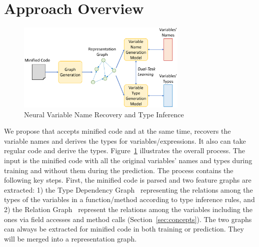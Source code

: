 \section{Approach Overview}


\begin{figure}[t]
	\begin{center}
	  \includegraphics[width=3.2in]{figures/overview-2.png}
          \vspace{-8pt}
          \caption{Neural Variable Name Recovery and Type Inference}
		\label{overview}
	\end{center}
\end{figure}



We propose {\tool} that accepts minified code and at the same time,
recovers the variable names and derives the types for
variables/expressions. It also can take regular code and derive the
types.
%
Figure~\ref{overview} illustrates the overall process. The input is
the minified code with all the original variables' names and types
during training and without them during the prediction.
%
The process contains the following key steps. First, the minified code
is parsed and two feature graphs are extracted: 1) the Type Dependency
Graph~\cite{HiTyper-icse22} representing the relations among the
types of the variables in a function/method according to type
inference rules, and 2) the Relation Graph~\cite{icse19} represent the
relations among the variables including the ones via field accesses
and method calls (Section~\ref{sec:concepts}). The two graphs can
always be extracted for minified code in both training or
prediction. They will be merged into a representation graph.

